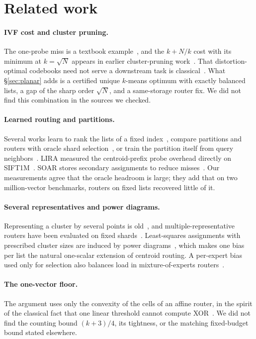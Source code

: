 \documentclass[11pt]{article}
\theoremstyle{definition}
\theoremstyle{remark}
\begin{document}
\section{Related work}\label{sec:related}

\paragraph{IVF cost and cluster pruning.} The one-probe miss is a textbook example~\cite{manning2008ir}, and the $k+N/k$ cost with its minimum at $k=\sqrt N$ appears in earlier cluster-pruning work~\cite{gudmundsson2010}. That distortion-optimal codebooks need not serve a downstream task is classical~\cite{oehler1995}. What \S\ref{sec:planar} adds is a certified unique $k$-means optimum with exactly balanced lists, a gap of the sharp order $\sqrt N$, and a same-storage router fix. We did not find this combination in the sources we checked.

\paragraph{Learned routing and partitions.} Several works learn to rank the lists of a fixed index~\cite{vecchiato2024,bruch2025}, compare partitions and routers with oracle shard selection~\cite{gottesburen2025}, or train the partition itself from query neighbors~\cite{gupta2022bliss,dong2020,bessa2026auctions,zeng2025lira}. LIRA measured the centroid-prefix probe overhead directly on SIFT1M~\cite{zeng2025lira}. SOAR stores secondary assignments to reduce misses~\cite{sun2023soar}. Our measurements agree that the oracle headroom is large; they add that on two million-vector benchmarks, routers on fixed lists recovered little of it.

\paragraph{Several representatives and power diagrams.} Representing a cluster by several points is old~\cite{guha1998cure}, and multiple-representative routers have been evaluated on fixed shards~\cite{bruch2025}. Least-squares assignments with prescribed cluster sizes are induced by power diagrams~\cite{aurenhammer1998}, which makes one bias per list the natural one-scalar extension of centroid routing. A per-expert bias used only for selection also balances load in mixture-of-experts routers~\cite{wang2024lossfree}.

\paragraph{The one-vector floor.} The argument uses only the convexity of the cells of an affine router, in the spirit of the classical fact that one linear threshold cannot compute XOR~\cite{minsky1969}. We did not find the counting bound $(k+3)/4$, its tightness, or the matching fixed-budget bound stated elsewhere.
\end{document}
